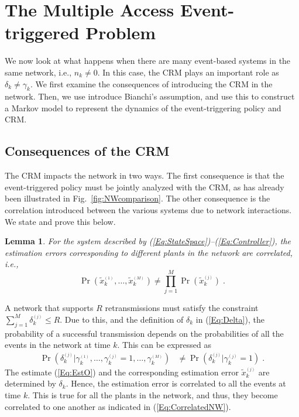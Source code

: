 \documentclass[journal]{IEEEtran}
\newtheorem{lemma}[theorem]{Lemma}
\begin{document}
\section{The Multiple Access Event-triggered Problem} \label{S:MA_ET}

We now look at what happens when there are many event-based systems in the same network, i.e., $n_k \neq 0$. In this case, the CRM plays an important role as $\delta_k \neq \gamma_k$. We first examine the consequences of introducing the CRM in the network. Then, we use introduce Bianchi's assumption, and use this to construct a Markov model to represent the dynamics of the event-triggering policy and CRM.

\subsection{Consequences of the CRM} \label{S:MAconsequences}
The CRM impacts the network in two ways. The first consequence is that the event-triggered policy must be jointly analyzed with the CRM, as has already been illustrated in Fig.~\ref{fig:NWcomparison}. The other consequence is the correlation introduced between the various systems due to network interactions. We state and prove this below. 
\begin{lemma} \label{Lemma:CorrelatedNW}
For the system described by (\ref{Eq:StateSpace})--(\ref{Eq:Controller}), the estimation errors corresponding to different plants in the network are correlated, i.e., \begin{equation} \label{Eq:CorrelatedNW}
\Pr(\tilde{x}^{_{(1)}}_{k},\dots,\tilde{x}^{_{(M)}}_{k}) \neq \prod_{j=1}^M \Pr(\tilde{x}^{_{(j)}}_{k} ) \; .
\end{equation}
\end{lemma}
\begin{IEEEproof}
A network that supports $R$ retransmissions must satisfy the constraint $\sum_{j=1}^{M} \delta^{_{(j)}}_k \le R$. Due to this, and the definition of $\delta_k$ in (\ref{Eq:Delta}), the probability of a successful transmission depends on the probabilities of all the events in the network at time $k$. This can be expressed as
\begin{align} \label{Eq:corrPrdelta}
\Pr(\delta^{_{(j)}}_k | \gamma^{_{(1)}}_{k},\dots,\gamma^{_{(j)}}_{k}=1,\dots,\gamma^{_{(M)}}_{k}) &\neq \Pr(\delta^{_{(j)}}_k | \gamma^{_{(j)}}_{k}=1) \; .
\end{align}
The estimate (\ref{Eq:EstO}) and the corresponding estimation error $\tilde{x}^{_{(j)}}_{k}$ are determined by $\delta_k$. Hence, the estimation error is correlated to all the events at time $k$. This is true for all the plants in the network, and thus, they become correlated to one another as indicated in (\ref{Eq:CorrelatedNW}).
\end{IEEEproof}
\end{document}
